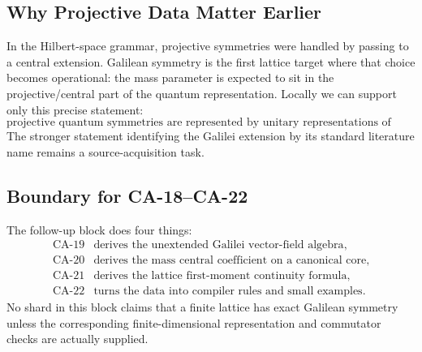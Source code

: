 \subsection{Why Projective Data Matter Earlier}

In the Hilbert-space grammar, projective symmetries were handled by passing to a
central extension.  Galilean symmetry is the first lattice target where that
choice becomes operational: the mass parameter is expected to sit in the
projective/central part of the quantum representation.  Locally we can support
only this precise statement:
\[
  \text{projective quantum symmetries are represented by unitary representations
  of central extensions.}
\]
The stronger statement identifying the Galilei extension by its standard
literature name remains a source-acquisition task.

\subsection{Boundary for CA-18--CA-22}

The follow-up block does four things:
\[
\begin{array}{ll}
\text{CA-19} & \text{derives the unextended Galilei vector-field algebra},\\
\text{CA-20} & \text{derives the mass central coefficient on a canonical core},\\
\text{CA-21} & \text{derives the lattice first-moment continuity formula},\\
\text{CA-22} & \text{turns the data into compiler rules and small examples}.
\end{array}
\]
No shard in this block claims that a finite lattice has exact Galilean symmetry
unless the corresponding finite-dimensional representation and commutator
checks are actually supplied.
